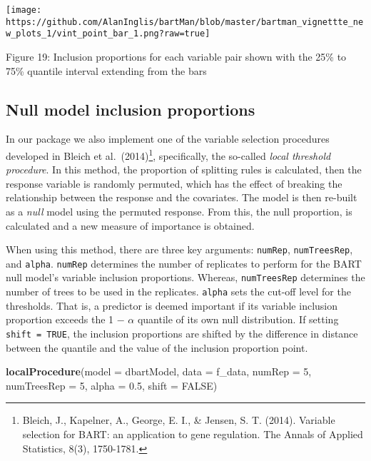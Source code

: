 \documentclass[
]{article}
\newenvironment{Shaded}{\begin{snugshade}}{\end{snugshade}}
\newcommand{\AttributeTok}[1]{\textcolor[rgb]{0.13,0.29,0.53}{#1}}
\newcommand{\ConstantTok}[1]{\textcolor[rgb]{0.56,0.35,0.01}{#1}}
\newcommand{\DecValTok}[1]{\textcolor[rgb]{0.00,0.00,0.81}{#1}}
\newcommand{\FloatTok}[1]{\textcolor[rgb]{0.00,0.00,0.81}{#1}}
\newcommand{\FunctionTok}[1]{\textcolor[rgb]{0.13,0.29,0.53}{\textbf{#1}}}
\newcommand{\NormalTok}[1]{#1}
\begin{document}
\begin{center}\texttt{[image: https://github.com/AlanInglis/bartMan/blob/master/bartman\_vignettte\_new\_plots\_1/vint\_point\_bar\_1.png?raw=true]} \end{center}

\protect\hypertarget{fig19:fig19}{}{Figure 19: } Inclusion proportions
for each variable pair shown with the 25\% to 75\% quantile interval
extending from the bars

\hypertarget{null-model-inclusion-proportions}{%
\subsection{Null model inclusion
proportions}\label{null-model-inclusion-proportions}}

In our package we also implement one of the variable selection
procedures developed in Bleich et al.~(2014)\footnote{Bleich, J.,
  Kapelner, A., George, E. I., \& Jensen, S. T. (2014). Variable
  selection for BART: an application to gene regulation. The Annals of
  Applied Statistics, 8(3), 1750-1781.}, specifically, the so-called
\emph{local threshold procedure}. In this method, the proportion of
splitting rules is calculated, then the response variable is randomly
permuted, which has the effect of breaking the relationship between the
response and the covariates. The model is then re-built as a \emph{null}
model using the permuted response. From this, the null proportion, is
calculated and a new measure of importance is obtained.

When using this method, there are three key arguments: \texttt{numRep},
\texttt{numTreesRep}, and \texttt{alpha}. \texttt{numRep} determines the
number of replicates to perform for the BART null model's variable
inclusion proportions. Whereas, \texttt{numTreesRep} determines the
number of trees to be used in the replicates. \texttt{alpha} sets the
cut-off level for the thresholds. That is, a predictor is deemed
important if its variable inclusion proportion exceeds the 1 −
\(\alpha\) quantile of its own null distribution. If setting
\texttt{shift\ =\ TRUE}, the inclusion proportions are shifted by the
difference in distance between the quantile and the value of the
inclusion proportion point.

\begin{Shaded}
\begin{Highlighting}[]
\FunctionTok{localProcedure}\NormalTok{(}\AttributeTok{model =}\NormalTok{ dbartModel,}
               \AttributeTok{data =}\NormalTok{ f\_data,}
               \AttributeTok{numRep =} \DecValTok{5}\NormalTok{,}
               \AttributeTok{numTreesRep =} \DecValTok{5}\NormalTok{,}
               \AttributeTok{alpha =} \FloatTok{0.5}\NormalTok{,}
               \AttributeTok{shift =} \ConstantTok{FALSE}\NormalTok{)}
\end{Highlighting}
\end{Shaded}
\end{document}
